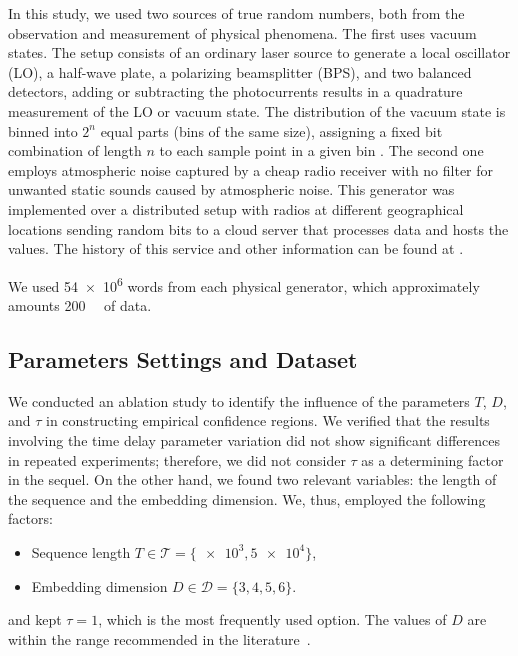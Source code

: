 \documentclass[alpha-refs]{wiley-article}
\begin{document}
In this study, we used two sources of true random numbers, both from the observation and measurement of physical phenomena.
The first uses vacuum states. 
The setup consists of an ordinary laser source to generate a local oscillator (LO), a half-wave plate, a polarizing beamsplitter (BPS), and two balanced detectors, adding or subtracting the photocurrents results in a quadrature measurement of the LO or vacuum state. 
The distribution of the vacuum state is binned into $2^n$ equal parts (bins of the same size), assigning a fixed bit combination of length $n$ to each sample point in a given bin \citep{RNGVacuumStates}. 
The second one employs atmospheric noise captured by a cheap radio receiver with no filter for unwanted static sounds caused by atmospheric noise.
This generator was implemented over a distributed setup with radios at different geographical locations sending random bits to a cloud server that processes data and hosts the values.
The history of this service and other information can be found at \citet{RandomOrg}.

We used \SI{54e6}{\byte} words from each physical generator, which approximately amounts \SI{200}{\mega\byte} of data.


\subsection{Parameters Settings and Dataset}\label{Sec:Parameters}

We conducted an ablation study to identify the influence of the parameters $T$, $D$, and $\tau$ in constructing empirical confidence regions.
We verified that the results involving the time delay parameter variation did not show significant differences in repeated experiments; therefore, we did not consider $\tau$ as a determining factor in the sequel.
On the other hand, we found two relevant variables: 
the length of the sequence 
and the embedding dimension.
We, thus, employed the following factors:
\begin{itemize}
	\item Sequence length $T\in\mathcal T=\{ \num[scientific-notation=true]{e3}, \num[scientific-notation=true]{5 e4}\}$,
	\item Embedding dimension $D\in\mathcal D=\{3, 4, 5, 6\}$.
\end{itemize}
and kept $\tau=1$, which is the most frequently used option.
The values of $D$ are within the range recommended in the literature~\citep{PermutationEntropyBandtPompe}.
\end{document}

